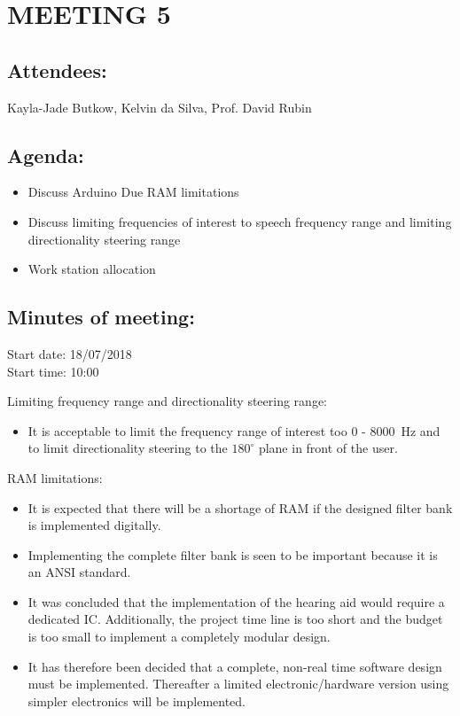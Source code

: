 \documentclass[10pt,onecolumn]{witseiepaper}
\begin{document}
\section*{MEETING 5}
\subsection*{Attendees:}
Kayla-Jade Butkow, Kelvin da Silva, Prof. David Rubin
\subsection*{Agenda:} 
\begin{itemize}
	\item Discuss Arduino Due RAM limitations
	\item Discuss limiting frequencies of interest to speech frequency range and limiting directionality steering range
	\item Work station allocation
\end{itemize}

\subsection*{Minutes of meeting:}
Start date: 18/07/2018 \\
Start time: 10:00

Limiting frequency range and directionality steering range:
\begin{itemize}
	\item It is acceptable to limit the frequency range of interest too 0 - 8000~Hz and to limit directionality steering to the $180^{\circ}$ plane in front of the user.
\end{itemize}

RAM limitations:
\begin{itemize}
	\item It is expected that there will be a shortage of RAM if the designed filter bank is implemented digitally.
	\item Implementing the complete filter bank is seen to be important because it is an ANSI standard.
	\item It was concluded that the implementation of the hearing aid would require a dedicated IC. Additionally, the project time line is too short and the budget is too small to implement a completely modular design.
	\item It has therefore been decided that a complete, non-real time software design must be implemented. Thereafter a limited electronic/hardware version using simpler electronics will be implemented.
\end{itemize}
\end{document}
